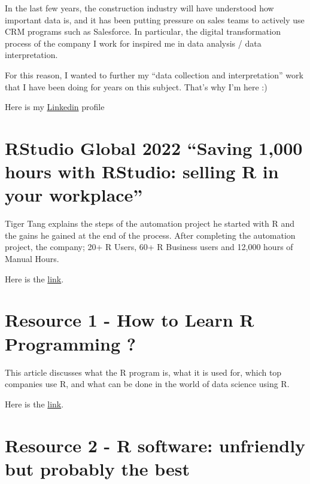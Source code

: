 \documentclass[
  letterpaper,
  DIV=11,
  numbers=noendperiod]{scrreprt}
\begin{document}
In the last few years, the construction industry will have understood
how important data is, and it has been putting pressure on sales teams
to actively use CRM programs such as Salesforce. In particular, the
digital transformation process of the company I work for inspired me in
data analysis / data interpretation.

For this reason, I wanted to further my ``data collection and
interpretation'' work that I have been doing for years on this subject.
That's why I'm here :)

Here is my
\href{https://www.linkedin.com/in/bayram-sayg\%C4\%B1l\%C4\%B1-1a525045/}{Linkedin}
profile

\hypertarget{rstudio-global-2022-saving-1000-hours-with-rstudio-selling-r-in-your-workplace}{%
\section{RStudio Global 2022 ``Saving 1,000 hours with RStudio: selling
R in your
workplace''}\label{rstudio-global-2022-saving-1000-hours-with-rstudio-selling-r-in-your-workplace}}

Tiger Tang explains the steps of the automation project he started with
R and the gains he gained at the end of the process. After completing
the automation project, the company; 20+ R Users, 60+ R Business users
and 12,000 hours of Manual Hours.

Here is the
\href{https://www.rstudio.com/conference/2022/talks/saving-1000-hours-rstudio/}{link}.

\hypertarget{resource-1---how-to-learn-r-programming}{%
\section{Resource 1 - How to Learn R Programming
?}\label{resource-1---how-to-learn-r-programming}}

This article discusses what the R program is, what it is used for, which
top companies use R, and what can be done in the world of data science
using R.

Here is the
\href{https://www.simplilearn.com/how-to-learn-r-programming-article}{link}.

\hypertarget{resource-2---r-software-unfriendly-but-probably-the-best}{%
\section{Resource 2 - R software: unfriendly but probably the
best}\label{resource-2---r-software-unfriendly-but-probably-the-best}}
\end{document}
